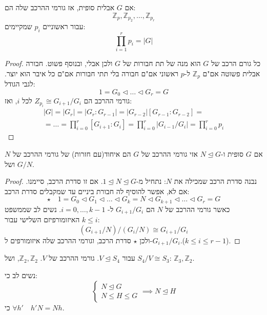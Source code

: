 \documentclass{tstextbook}
\begin{document}
\begin{proposition}
אם \(G\) אבלית סופית, אז גורמי ההרכב שלה הם:
$$\mathbb{Z} _{p},\mathbb{Z} _{p_{2}},\dots,\mathbb{Z} _{p_{r}}$$
עבור ראשוניים \(p_{i}\) שמקיימים: 
$$\prod_{i=1}^r p_{i}= |G|$$

\end{proposition}
\begin{proof}
כל גורם הרכב של \(G\) הוא מנה של תת חבורות של \(G\) ולכן אבלי, ובנוסף פשוט. חבורה אבלית פשוטה אם"ם \(\mathbb{Z} _p\) ל-\(p\) ראשוני אם"ם חבורה בלי תתי חבורות אם"ם כל איבר הוא יוצר. לגבי הגודל:
$$1=G_{0}\triangleleft \dots \triangleleft G_{r}=G$$
גורמי ההרכב הם \(Z_{p_{i}}\cong G_{i+1} / G_{i}\) לכל \(i\), ואז: 
$$\begin{gathered}|G|=|G_{r}|=|G_{r}:G_{r-1}|=|G_{r-2}|[G_{r-1}:G_{r-2}]= \\=\dots=\prod_{i=0}^r [G_{i+1}:G_{i}]=\prod_{i=0}^r |G_{i-1} / G_{i}|=\prod_{i=0}^r p_{i}
\end{gathered}$$

\end{proof}
\begin{proposition}
אם \(G\) סופית ו-\(N\trianglelefteq G\) אזי גורמי ההרכב של \(G\) הם איחוד(עם חזרות) של גורמי ההרכב של \(N\) ושל \(G / N\).

\end{proposition}
\begin{proof}
נבנה סדרת הרכב שמכילה את \(N\): נתחיל מ-\(1\trianglelefteq N\trianglelefteq G\). אם זו סדרת הרכב, סיימנו. אם לא, אפשר להוסיף לה חבורת ביניים עד שמקבלים סדרת הרכב:
$$\star \quad 1=G_{0}\triangleleft G_{1} \triangleleft \dots \triangleleft G_{k}=N\triangleleft G_{k+1}\triangleleft \dots \triangleleft G_{r} = G$$
כאשר גורמי ההרכב של \(N\) הם \(G_{i+1} / G_{i}\) ל- \(i=0,\dots,k-1\). נשים לב שממשפט האיזומורפיזם השלישי עבור \(k\leq i\):
$$(G_{i+1} / N) / (G_{i} / N) \cong G_{i+1} / G_{i}$$
ולכן \(\star\) סדרת הרכב, וגורמי ההרכב שלה איזומורפים ל-\(G_{i+1} / G_{i}\).(\(k\leq i\leq r-1\)).

\end{proof}
\begin{example}
עבור \(V\trianglelefteq S_{4}\). גורמי ההרכב של \(V\). \(\mathbb{Z} _2,\mathbb{Z} _2\), ושל \(S_{4} / V \cong S_{3}\): \(\mathbb{Z} _3,\mathbb{Z} _2\).

\end{example}
\begin{remark}
נשים לב כי: $$\begin{cases}N\trianglelefteq G \\N\leq H\leq G
\end{cases}\implies N\trianglelefteq  H$$ כי \(\forall h'\quad h'N=Nh\).

\end{remark}
\end{document}
